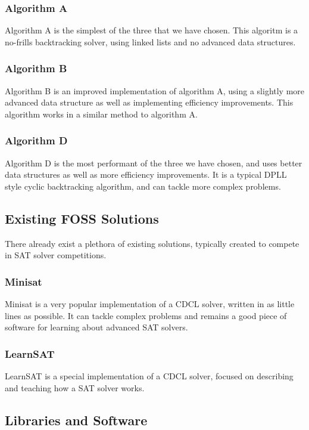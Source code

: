 \documentclass{article}
\begin{document}
\subsubsection{Algorithm A}
Algorithm A is the simplest of the three that we have chosen. This algoritm is a no-frills backtracking solver, using linked lists and no advanced data
structures.

\subsubsection{Algorithm B}
Algorithm B is an improved implementation of algorithm A, using a slightly more advanced data structure as well as implementing efficiency improvements.
This algorithm works in a similar method to algorithm A.

\subsubsection{Algorithm D}
Algorithm D is the most performant of the three we have chosen, and uses better data structures as well as more efficiency improvements. It is a typical
DPLL style cyclic backtracking algorithm, and can tackle more complex problems.

\subsection{Existing FOSS Solutions}
There already exist a plethora of existing solutions, typically created to compete in SAT solver competitions.
\subsubsection{Minisat}
Minisat is a very popular implementation of a CDCL solver, written in as little lines as possible. It can tackle complex problems and remains a good piece
of software for learning about advanced SAT solvers.
\subsubsection{LearnSAT}
LearnSAT is a special implementation of a CDCL solver, focused on describing and teaching how a SAT solver works.

\subsection{Libraries and Software}
\end{document}

